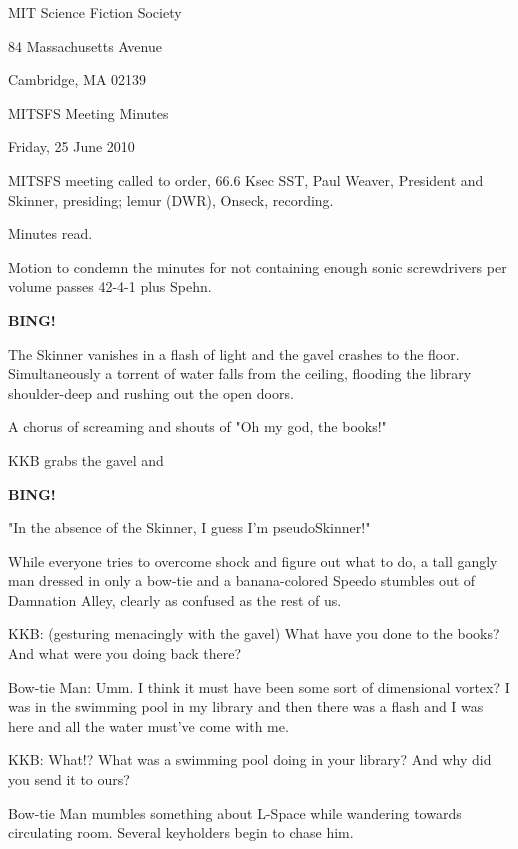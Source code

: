 \documentclass[10pt]{article}
\newcommand{\bing}{{\bf BING!} }
\newcommand{\skinner}{Paul Weaver, President and Skinner}
\newcommand{\onseck}{lemur (DWR), Onseck}
\newcommand{\meetingdate}{Friday, 25 June 2010}
\begin{document}
\begin{center}

MIT Science Fiction Society

84 Massachusetts Avenue

Cambridge, MA 02139

\vspace{12pt}

MITSFS Meeting Minutes

\meetingdate

\end{center}

\vspace{18pt}

\setlength{\parskip}{6pt}

\noindent
MITSFS meeting called to order, 66.6 Ksec SST,
\skinner, presiding; \onseck, recording.

Minutes read.

Motion to condemn the minutes for not containing enough sonic screwdrivers per volume passes
42-4-1 plus Spehn. 

\bing

The Skinner vanishes in a flash of light and the gavel crashes to the floor.  Simultaneously
a torrent of water falls from the ceiling, flooding the library shoulder-deep and rushing out
the open doors.

A chorus of screaming and shouts of "Oh my god, the books!"

KKB grabs the gavel and

\bing

"In the absence of the Skinner, I guess I'm pseudoSkinner!"

While everyone tries to overcome shock and figure out what to do, a tall gangly man dressed
in only a bow-tie and a banana-colored Speedo stumbles out of Damnation Alley, clearly as
confused as the rest of us.

KKB: (gesturing menacingly with the gavel) What have you done to the books?  And what
were you doing back there?

Bow-tie Man: Umm.  I think it must have been some sort of dimensional vortex?  I was in
the swimming pool in my library and then there was a flash and I was here and all the water
must've come with me.

KKB: What!?  What was a swimming pool doing in your library?  And why did you send it to ours?

Bow-tie Man mumbles something about L-Space while wandering towards circulating room.  Several keyholders begin to chase him.
\end{document}
